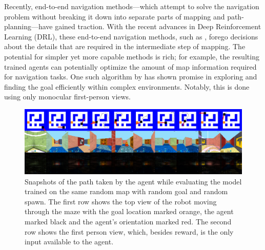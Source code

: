 Recently, end-to-end navigation methods---which attempt to  
solve the navigation problem without breaking it down into separate parts of mapping and path-planning---have gained traction.
%
With the recent advances in Deep Reinforcement Learning (DRL), these end-to-end navigation methods, such as \cite{MnBaMiICML2016,SiHuMaNATURE2016,LePaKrISER2017,MiPaViICLR2017,OhChSiICML2016}, forego decisions about the details that are required in the intermediate step of mapping.
The potential for simpler yet more capable methods is rich; for example, the resulting trained agents can potentially optimize the amount of map information required for navigation tasks.
One such algorithm by \cite{MiPaViICLR2017} has shown promise in exploring and finding the goal efficiently within complex environments. Notably, this is done using only monocular first-person views.

\begin{figure}
\includegraphics[width=\textwidth,trim=0 336pt 0 0,clip]{./exp-results/training-09x09-0127-on-0127.png}%
\caption{
Snapshots of the path taken by the agent while evaluating the model trained on the same random map with random goal and random spawn.
The first row shows the top view of the robot moving through the maze with the goal location marked orange, the agent marked black and the agent's orientation marked red. The second row shows the first person view, which, besides reward, is the only input available to the agent.}
\label{fig:training-qualitative}
\end{figure}

